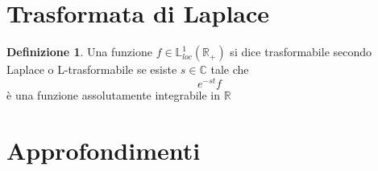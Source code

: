 \documentclass{article}
\theoremstyle{definition}
\newtheorem*{definizione}{Definizione}
\newcommand{\R}{\mathbb{R}}
\newcommand{\C}{\mathbb{C}}
\begin{document}
\section{Trasformata di Laplace}
\begin{definizione}
	Una funzione $f \in \mathbb{L}_{loc}^1(\R_+)$ si dice trasformabile secondo Laplace o L-trasformabile se esiste $s \in \C$ tale che 
	$$e^{-st}f$$ è una funzione assolutamente integrabile in $\R$
\end{definizione}





































\newpage
\section{Approfondimenti}
\end{document}
